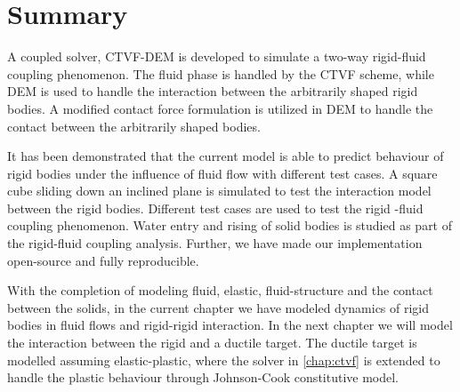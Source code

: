 

\FloatBarrier%
\section{Summary}
\label{sec:Summary}
A coupled solver, CTVF-DEM is developed to simulate a two-way rigid-fluid
coupling phenomenon. The fluid phase is handled by the CTVF scheme, while DEM is
used to handle the interaction between the arbitrarily shaped rigid bodies. A
modified contact force formulation is utilized in DEM to handle the contact
between the arbitrarily shaped bodies.

It has been demonstrated that the current model is able to predict behaviour of
rigid bodies under the influence of fluid flow with different test cases. A
square cube sliding down an inclined plane is simulated to test the interaction
model between the rigid bodies. Different test cases are used to test the rigid
-fluid coupling phenomenon. Water entry and rising of solid bodies is studied as
part of the rigid-fluid coupling analysis.
Further, we have made our implementation open-source and fully reproducible.

With the completion of modeling fluid, elastic, fluid-structure and the contact
between the solids, in the current chapter we have modeled dynamics of rigid
bodies in fluid flows and rigid-rigid interaction. In the next chapter we will
model the interaction between the rigid and a ductile target. The ductile target
is modelled assuming elastic-plastic, where the solver in \cref{chap:ctvf} is
extended to handle the plastic behaviour through Johnson-Cook constitutive
model.
